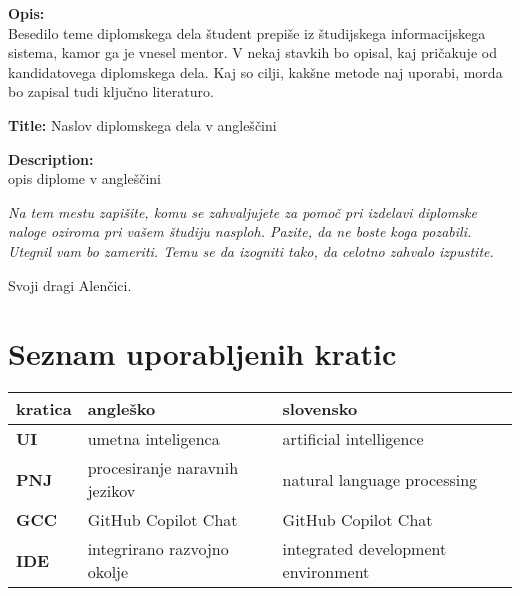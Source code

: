 \documentclass[a4paper,12pt,openright]{book}
\newcommand{\clearemptydoublepage}{\newpage{\pagestyle{empty}\cleardoublepage}}
\begin{document}
\bigskip
\noindent\textbf{Opis:}\\
Besedilo teme diplomskega dela študent prepiše iz študijskega informacijskega sistema, kamor ga je vnesel mentor. 
V nekaj stavkih bo opisal, kaj pričakuje od kandidatovega diplomskega dela. 
Kaj so cilji, kakšne metode naj uporabi, morda bo zapisal tudi ključno literaturo.

\bigskip
\noindent\textbf{Title:} Naslov diplomskega dela v angleščini

\bigskip
\noindent\textbf{Description:}\\
opis diplome v angleščini

\vfill



\vspace{2cm}

\clearemptydoublepage

\thispagestyle{empty}\mbox{}\vfill\null\it%
\noindent
Na tem mestu zapišite, komu se zahvaljujete za pomoč pri izdelavi diplomske naloge oziroma pri vašem študiju nasploh. Pazite, da ne boste koga pozabili. Utegnil vam bo zameriti. Temu se da izogniti tako, da celotno zahvalo izpustite.
\rm\normalfont

\clearemptydoublepage

\thispagestyle{empty}\mbox{}{\textheight}\mbox{}\hfill\begin{minipage}{0.55\textwidth}%
Svoji dragi Alenčici.
\normalfont\end{minipage}

\clearemptydoublepage


\pagestyle{empty}
\def\thepage{}%
\tableofcontents{}


\clearemptydoublepage


\chapter*{Seznam uporabljenih kratic}

\noindent\begin{tabular}{p{}|p{}|p{}}    %
  {\bf kratica} & {\bf angleško}                              & {\bf slovensko} \\ \hline
  {\bf UI}      & umetna inteligenca               & artificial intelligence \\
  {\bf PNJ} & procesiranje naravnih jezikov & natural language processing \\
  {\bf GCC}   & GitHub Copilot Chat              & GitHub Copilot Chat \\
    {\bf IDE}   & integrirano razvojno okolje              & integrated development environment \\
\end{tabular}
\end{document}
